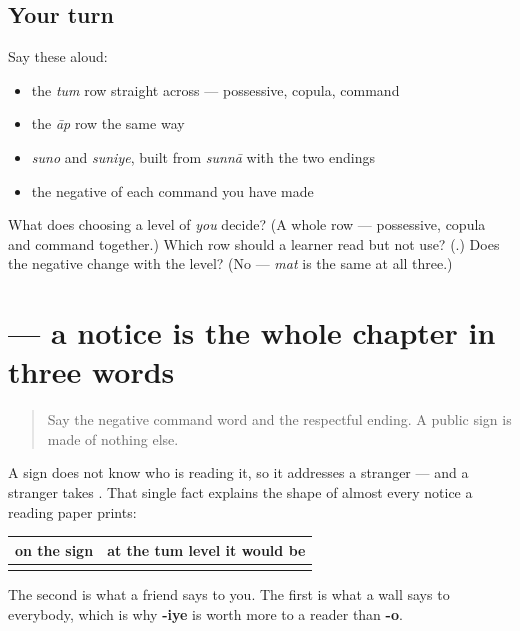 \subsection*{Your turn}
Say these aloud:

\begin{itemize}
\raggedright
  \item the \emph{tum} row straight across — possessive, copula, command
  \item the \emph{āp} row the same way
  \item \emph{suno} and \emph{suniye}, built from \emph{sunnā} with the two endings
  \item the negative of each command you have made
\end{itemize}

\begin{tcolorbox}[breakable,colback=teal!4,colframe=teal!35!black,title={Before you move on}]
What does choosing a level of \emph{you} decide? (A whole row — possessive, copula and command together.) Which row should a learner read but not use? (\textbf{}.) Does the negative change with the level? (No — \emph{mat} is the same at all three.)
\end{tcolorbox}
\section[\texorpdfstring{\hi{यहाँ} \hi{मत} \hi{बैठिए} (yahā̃ mat baiṭhiye)}{यहाँ मत बैठिए (yahā̃ mat baiṭhiye)}]{   — a notice is the whole chapter in three words}

\label{lesson:HI-C85-sintesis-suchna}



\begin{quote}
Say the negative command word and the respectful ending. A public sign is made of nothing else.
\end{quote}

\begin{grammarlens}[title={Grammar Lens: why a notice is always at the aap level}]
A sign does not know who is reading it, so it addresses a stranger — and a stranger takes \textbf{}. That single fact explains the shape of almost every notice a reading paper prints:

\noindent
\begin{tabularx}{\linewidth}{@{}>{\raggedright\arraybackslash}X>{\raggedright\arraybackslash}X@{}}
\toprule
\textbf{on the sign} & \textbf{at the tum level it would be} \\
\midrule
\hi{यहाँ} \hi{मत} \hi{बैठिए} & \hi{यहाँ} \hi{मत} \hi{बैठो} \\
\bottomrule
\end{tabularx}

The second is what a friend says to you. The first is what a wall says to everybody, which is why \textbf{-iye} is worth more to a reader than \textbf{-o}.
\end{grammarlens}

